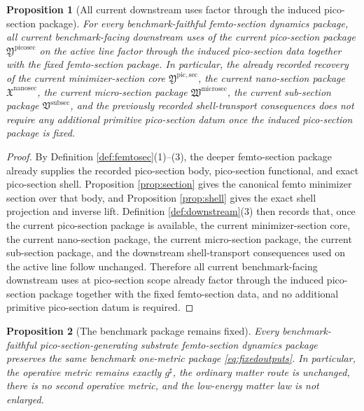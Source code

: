 \documentclass[11pt]{article}
\newcommand{\CompletedMetric}{g^{\sharp}}
\newcommand{\SubSectionPackage}{\mathfrak V^{\mathrm{subsec}}}
\newcommand{\MicroSectionPackage}{\mathfrak W^{\mathrm{microsec}}}
\newcommand{\NanoSectionPackage}{\mathfrak X^{\mathrm{nanosec}}}
\newcommand{\PicoSectionPackage}{\mathfrak Y^{\mathrm{picosec}}}
\newcommand{\PicoMinSectionCore}{\mathfrak Y^{\mathrm{pic,sec}}}
\newtheorem{proposition}{Proposition}
\begin{document}
\begin{proposition}[All current downstream uses factor through the induced pico-section package]
\label{prop:downstream}
For every benchmark-faithful femto-section dynamics package, all current benchmark-facing downstream uses of the current pico-section package \(\PicoSectionPackage\) on the active line factor through the induced pico-section data together with the fixed femto-section package. In particular, the already recorded recovery of the current minimizer-section core \(\PicoMinSectionCore\), the current nano-section package \(\NanoSectionPackage\), the current micro-section package \(\MicroSectionPackage\), the current sub-section package \(\SubSectionPackage\), and the previously recorded shell-transport consequences does not require any additional primitive pico-section datum once the induced pico-section package is fixed.
\end{proposition}

\begin{proof}
By Definition \ref{def:femtosec}(1)--(3), the deeper femto-section package already supplies the recorded pico-section body, pico-section functional, and exact pico-section shell. Proposition \ref{prop:section} gives the canonical femto minimizer section over that body, and Proposition \ref{prop:shell} gives the exact shell projection and inverse lift. Definition \ref{def:downstream}(3) then records that, once the current pico-section package is available, the current minimizer-section core, the current nano-section package, the current micro-section package, the current sub-section package, and the downstream shell-transport consequences used on the active line follow unchanged. Therefore all current benchmark-facing downstream uses at pico-section scope already factor through the induced pico-section package together with the fixed femto-section data, and no additional primitive pico-section datum is required.
\end{proof}

\begin{proposition}[The benchmark package remains fixed]
\label{prop:benchmark}
Every benchmark-faithful pico-section-generating substrate femto-section dynamics package preserves the same benchmark one-metric package \eqref{eq:fixedoutputs}. In particular, the operative metric remains exactly \(\CompletedMetric\), the ordinary matter route is unchanged, there is no second operative metric, and the low-energy matter law is not enlarged.
\end{proposition}
\end{document}
